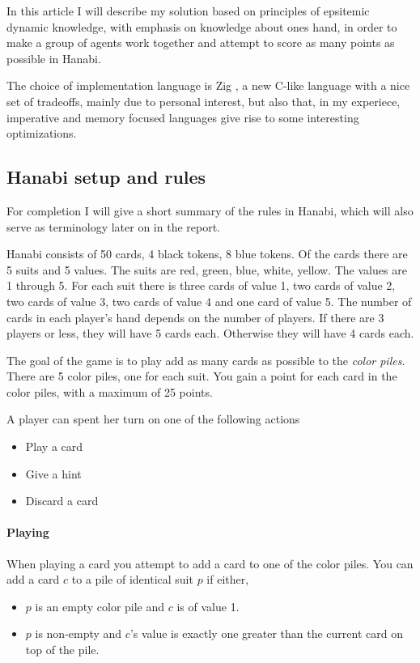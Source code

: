 In this article I will describe my solution based on principles of epsitemic dynamic knowledge, with emphasis on knowledge about ones hand, in order to make a group of agents work together and attempt to score as many points as possible in Hanabi. 

The choice of implementation language is Zig \cite{Ziglang}, a new C-like language with a nice set of tradeoffs, mainly due to personal interest, but also that, in my experiece, imperative and memory focused languages give rise to some interesting optimizations. 




\subsection{Hanabi setup and rules}
For completion I will give a short summary of the rules in Hanabi, which will also serve as terminology later on in the report.

Hanabi consists of 50 cards, 4 black tokens, 8 blue tokens.  
Of the cards there are 5 suits and 5 values. 
The suits are red, green, blue, white, yellow. 
The values are 1 through 5. 
For each suit there is three cards of value 1, two cards of value 2, two cards of value 3, two cards of value 4 and one card of value 5.
The number of cards in each player's hand depends on the number of players. If there are 3 players or less, they will have 5 cards each. Otherwise they will have 4 cards each.

The goal of the game is to play add as many cards as possible to the \emph{color piles}. 
There are 5 color piles, one for each suit. You gain a point for each card in the color piles, with a maximum of 25 points.

A player can spent her turn on one of the following actions

\begin{itemize}
\item Play a card
\item Give a hint
\item Discard a card
\end{itemize}

\paragraph{Playing}
When playing a card you attempt to add a card to one of the color piles.
You can add a card $c$ to a pile of identical suit $p$ if either, 

\begin{itemize}	
\item $p$ is an empty color pile and $c$ is of value 1.
\item $p$ is non-empty and $c$'s value is exactly one greater than the current card on top of the pile.
\end{itemize}

